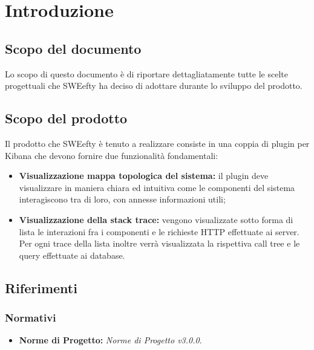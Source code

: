 \section{Introduzione}
\label{sec:intro}
	\subsection{Scopo del documento}
	Lo scopo di questo documento è di riportare dettagliatamente tutte le scelte progettuali che SWEefty ha deciso di adottare durante lo sviluppo del prodotto.
	
	\subsection{Scopo del prodotto}
	Il prodotto che SWEefty è tenuto a realizzare consiste in una coppia di plugin per Kibana che devono fornire due funzionalità fondamentali:
	\begin{itemize}
		\item \textbf{Visualizzazione mappa topologica del sistema:} il plugin deve visualizzare in maniera chiara ed intuitiva come le componenti del sistema interagiscono tra di loro, con annesse informazioni utili;
		\item \textbf{Visualizzazione della stack trace:} vengono visualizzate sotto forma di lista le interazioni fra i componenti e le richieste HTTP effettuate ai server. Per ogni trace della lista inoltre verrà visualizzata la rispettiva call tree e le query effettuate ai database.
	\end{itemize}

	\subsection{Riferimenti}
		\subsubsection{Normativi}
			\begin{itemize}
				\item \textbf{Norme di Progetto:} \emph{Norme di Progetto v3.0.0}.
			\end{itemize}

